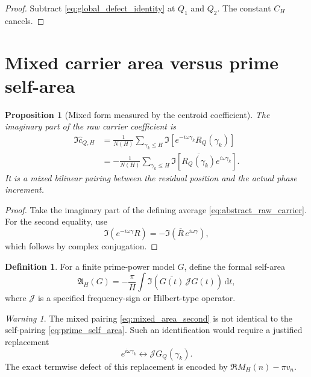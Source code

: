 \documentclass[11pt]{amsart}
\numberwithin{equation}{section}
\theoremstyle{plain}
\newtheorem{proposition}[theorem]{Proposition}
\theoremstyle{definition}
\newtheorem{definition}[theorem]{Definition}
\theoremstyle{remark}
\newtheorem{warning}[theorem]{Warning}
\newcommand{\1}{\mathbf{1}}
\newcommand{\dd}{\,\mathrm{d}}
\newcommand{\cJ}{\mathcal J}
\begin{document}
\begin{proof}
Subtract \eqref{eq:global_defect_identity} at \(Q_1\) and \(Q_2\).
The constant \(C_H\) cancels.
\end{proof}

\section{Mixed carrier area versus prime self-area}
\label{sec:mixed_vs_self_area}

\begin{proposition}[Mixed form measured by the centroid coefficient]
\label{prop:mixed_area}
The imaginary part of the raw carrier coefficient is
\begin{align}
\Im\widehat c_{Q,H}
&=
\frac1{N(H)}
\sum_{\gamma_k\leq H}
\Im\left[
e^{-i\omega\gamma_k}R_Q(\gamma_k)
\right]
\label{eq:mixed_area_first}
\\
&=
-\frac1{N(H)}
\sum_{\gamma_k\leq H}
\Im\left[
\overline{R_Q(\gamma_k)}
e^{i\omega\gamma_k}
\right].
\label{eq:mixed_area_second}
\end{align}
It is a mixed bilinear pairing between the residual position and the
actual phase increment.
\end{proposition}

\begin{proof}
Take the imaginary part of the defining average
\eqref{eq:abstract_raw_carrier}.  For the second equality, use
\begin{equation}
\Im(e^{-i\omega\gamma}R)
=
-\Im(\overline R\,e^{i\omega\gamma}),
\label{eq:mixed_area_conjugation}
\end{equation}
which follows by complex conjugation.
\end{proof}

\begin{definition}
\label{def:prime_self_area}
For a finite prime-power model \(G\), define the formal self-area
\begin{equation}
\mathfrak A_H(G)
=
-\frac{\pi}{H}
\int
\Im\left(
\overline{G(t)}\,\cJ G(t)
\right)\dd t,
\label{eq:prime_self_area}
\end{equation}
where \(\cJ\) is a specified frequency-sign or Hilbert-type operator.
\end{definition}

\begin{warning}
\label{warn:mixed_not_self}
The mixed pairing \eqref{eq:mixed_area_second} is not identical to the
self-pairing \eqref{eq:prime_self_area}.  Such an identification would
require a justified replacement
\begin{equation}
e^{i\omega\gamma_k}
\longleftrightarrow
\cJ G_Q(\gamma_k).
\label{eq:unproved_operator_replacement}
\end{equation}
The exact termwise defect of this replacement is encoded by
\(\Re M_H(n)-\pi v_n\).
\end{warning}
\end{document}

